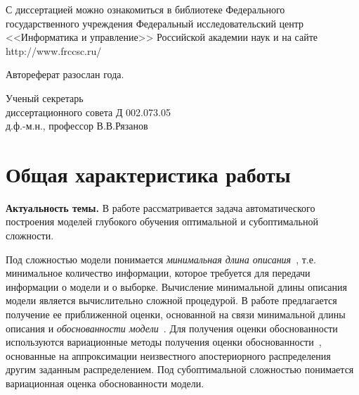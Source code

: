 \documentclass[11pt, a5paper]{dissert}
\theoremstyle{definition}
\begin{document}
{\vspace{0.2cm}
\noindent С диссертацией можно ознакомиться в библиотеке Федерального государственного учреждения Федеральный исследовательский центр <<Информатика и управление>> Российской академии наук и на сайте http://www.frccsc.ru/

\vspace{0.2cm}
\noindent Автореферат разослан  \quad {} года.

\vspace{0.3cm}
\noindent Ученый секретарь\\
диссертационного совета Д 002.073.05\\
д.ф.-м.н., профессор
\hspace{9cm} В.В.Рязанов
}

\clearpage





\section*{Общая характеристика работы}
\label{ch:Introduction}

\textbf{Актуальность темы.}
В работе рассматривается задача автоматического построения моделей глубокого обучения оптимальной и субоптимальной сложности. 

Под сложностью модели понимается \emph{минимальная длина описания}~\cite{mdl}, т.е. минимальное количество информации, которое требуется для передачи информации о модели и о выборке. Вычисление минимальной длины описания модели является вычислительно сложной процедурой. В работе предлагается получение ее приближенной оценки, основанной на связи минимальной длины описания и \emph{обоснованности модели}~\cite{mdl}. Для получения оценки обоснованности используются вариационные методы получения оценки обоснованности~\cite{bishop}, основанные на аппроксимации неизвестного апостериорного распределения другим заданным распределением. Под субоптимальной сложностью понимается вариационная оценка обоснованности модели.
\end{document}
